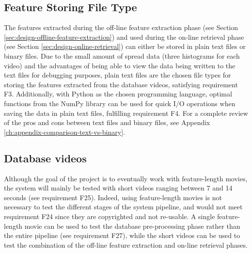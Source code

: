 
\subsection{Feature Storing File Type}
\label{sec:design-feature-storing-file-type}

The features extracted during the off-line feature extraction phase (see Section \ref{sec:design-offline-feature-extraction}) and used during the on-line retrieval phase (see Section \ref{sec:design-online-retrieval}) can either be stored in plain text files or binary files. Due to the small amount of spread data (three histograms for each video) and the advantages of being able to view the data being written to the text files for debugging purposes, plain text files are the chosen file types for storing the features extracted from the database videos, satisfying requirement F3. Additionally, with Python as the chosen programming language, optimal functions from the NumPy library can be used for quick I/O operations when saving the data in plain text files, fulfilling requirement F4. For a complete review of the pros and cons between text files and binary files, see Appendix \ref{ch:appendix-comparison-text-vs-binary}.


\subsection{Database videos}

Although the goal of the project is to eventually work with feature-length movies, the system will mainly be tested with short videos ranging between 7 and 14 seconds (see requirement F25). Indeed, using feature-length movies is not necessary to test the different stages of the system pipeline, and would not meet requirement F24 since they are copyrighted and not re-usable. A single feature-length movie can be used to test the database pre-processing phase rather than the entire pipeline (see requirement F27), while the short videos can be used to test the combination of the off-line feature extraction and on-line retrieval phases.


